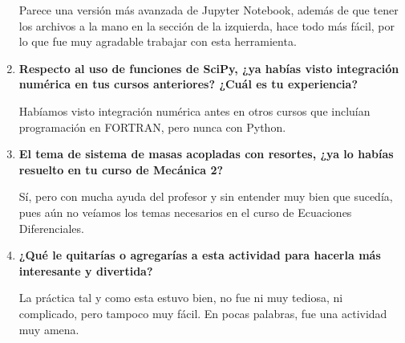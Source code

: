 \documentclass[a4paper]{article}
\begin{document}
\begin{center}
\begin{enumerate}
Parece una versión más avanzada de Jupyter Notebook, además de que tener los archivos a la mano en la sección de la izquierda, hace todo más fácil, por lo que fue muy agradable trabajar con esta herramienta.

\item \textbf{Respecto al uso de funciones de SciPy, ¿ya habías visto integración numérica en tus cursos anteriores? ¿Cuál es tu experiencia?}

Habíamos visto integración numérica antes en otros cursos que incluían programación en FORTRAN, pero nunca con Python.

\item \textbf{El tema de sistema de masas acopladas con resortes, ¿ya lo habías resuelto en tu curso de Mecánica 2?}  

Sí, pero con mucha ayuda del profesor y sin entender muy bien que sucedía, pues aún no veíamos los temas necesarios en el curso de Ecuaciones Diferenciales. 

\item \textbf{¿Qué le quitarías o agregarías a esta actividad para hacerla más interesante y divertida?}

La práctica tal y como esta estuvo bien, no fue ni muy tediosa, ni complicado, pero tampoco muy fácil. En pocas palabras, fue una actividad muy amena. 
\end{enumerate}

\end{center}
\end{document}
